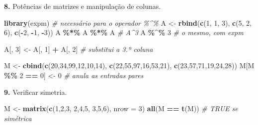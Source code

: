 \documentclass[
  portuguese,
  11pt,
  openany]{book}
\newenvironment{Shaded}{\begin{snugshade}}{\end{snugshade}}
\newcommand{\AttributeTok}[1]{\textcolor[rgb]{0.13,0.29,0.53}{#1}}
\newcommand{\CommentTok}[1]{\textcolor[rgb]{0.56,0.35,0.01}{\textit{#1}}}
\newcommand{\DecValTok}[1]{\textcolor[rgb]{0.00,0.00,0.81}{#1}}
\newcommand{\FunctionTok}[1]{\textcolor[rgb]{0.13,0.29,0.53}{\textbf{#1}}}
\newcommand{\NormalTok}[1]{#1}
\newcommand{\OtherTok}[1]{\textcolor[rgb]{0.56,0.35,0.01}{#1}}
\newcommand{\SpecialCharTok}[1]{\textcolor[rgb]{0.81,0.36,0.00}{\textbf{#1}}}
\begin{document}
\textbf{8.} Potências de matrizes e manipulação de colunas.

\begin{Shaded}
\begin{Highlighting}[]
\FunctionTok{library}\NormalTok{(expm)   }\CommentTok{\# necessário para o operador \%\^{}\%}
\NormalTok{A }\OtherTok{\textless{}{-}} \FunctionTok{rbind}\NormalTok{(}\FunctionTok{c}\NormalTok{(}\DecValTok{1}\NormalTok{, }\DecValTok{1}\NormalTok{, }\DecValTok{3}\NormalTok{), }\FunctionTok{c}\NormalTok{(}\DecValTok{5}\NormalTok{, }\DecValTok{2}\NormalTok{, }\DecValTok{6}\NormalTok{), }\FunctionTok{c}\NormalTok{(}\SpecialCharTok{{-}}\DecValTok{2}\NormalTok{, }\SpecialCharTok{{-}}\DecValTok{1}\NormalTok{, }\SpecialCharTok{{-}}\DecValTok{3}\NormalTok{))}
\NormalTok{A }\SpecialCharTok{\%*\%}\NormalTok{ A }\SpecialCharTok{\%*\%}\NormalTok{ A   }\CommentTok{\# A\^{}3}
\NormalTok{A }\SpecialCharTok{\%\^{}\%} \DecValTok{3}         \CommentTok{\# o mesmo, com expm}

\NormalTok{A[, }\DecValTok{3}\NormalTok{] }\OtherTok{\textless{}{-}}\NormalTok{ A[, }\DecValTok{1}\NormalTok{] }\SpecialCharTok{+}\NormalTok{ A[, }\DecValTok{2}\NormalTok{]   }\CommentTok{\# substitui a 3.ª coluna}

\NormalTok{M }\OtherTok{\textless{}{-}} \FunctionTok{cbind}\NormalTok{(}\FunctionTok{c}\NormalTok{(}\DecValTok{20}\NormalTok{,}\DecValTok{34}\NormalTok{,}\DecValTok{99}\NormalTok{,}\DecValTok{12}\NormalTok{,}\DecValTok{10}\NormalTok{,}\DecValTok{14}\NormalTok{), }\FunctionTok{c}\NormalTok{(}\DecValTok{22}\NormalTok{,}\DecValTok{55}\NormalTok{,}\DecValTok{97}\NormalTok{,}\DecValTok{16}\NormalTok{,}\DecValTok{53}\NormalTok{,}\DecValTok{21}\NormalTok{), }\FunctionTok{c}\NormalTok{(}\DecValTok{23}\NormalTok{,}\DecValTok{57}\NormalTok{,}\DecValTok{71}\NormalTok{,}\DecValTok{19}\NormalTok{,}\DecValTok{24}\NormalTok{,}\DecValTok{28}\NormalTok{))}
\NormalTok{M[M }\SpecialCharTok{\%\%} \DecValTok{2} \SpecialCharTok{==} \DecValTok{0}\NormalTok{] }\OtherTok{\textless{}{-}} \DecValTok{0}         \CommentTok{\# anula as entradas pares}
\end{Highlighting}
\end{Shaded}

\textbf{9.} Verificar simetria.

\begin{Shaded}
\begin{Highlighting}[]
\NormalTok{M }\OtherTok{\textless{}{-}} \FunctionTok{matrix}\NormalTok{(}\FunctionTok{c}\NormalTok{(}\DecValTok{1}\NormalTok{,}\DecValTok{2}\NormalTok{,}\DecValTok{3}\NormalTok{, }\DecValTok{2}\NormalTok{,}\DecValTok{4}\NormalTok{,}\DecValTok{5}\NormalTok{, }\DecValTok{3}\NormalTok{,}\DecValTok{5}\NormalTok{,}\DecValTok{6}\NormalTok{), }\AttributeTok{nrow =} \DecValTok{3}\NormalTok{)}
\FunctionTok{all}\NormalTok{(M }\SpecialCharTok{==} \FunctionTok{t}\NormalTok{(M))     }\CommentTok{\# TRUE se simétrica}
\end{Highlighting}
\end{Shaded}
\end{document}
